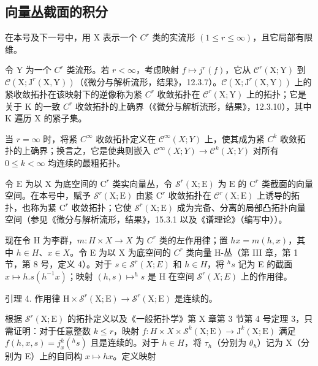 \subsection{向量丛截面的积分}

在本号及下一号中，用 X 表示一个 \(C^{r}\) 类的实流形 \((1 \leq r \leq \infty)\)，且它局部有限维。

令 Y 为一个 \(C^{r}\) 类流形。若 \(r < \infty\)，考虑映射 \(f \mapsto j^{r}(f)\)，它从 \(\mathcal{C}^{r}(\mathrm{X};\mathrm{Y})\) 到 \(\mathcal{C}(\mathrm{X};\mathrm{J}^{r}(\mathrm{X},\mathrm{Y}))\)（《微分与解析流形，结果》，12.3.7）。\(\mathcal{C}(\mathrm{X};\mathrm{J}^{r}(\mathrm{X},\mathrm{Y}))\) 上的紧收敛拓扑在该映射下的逆像称为紧 \(C^{r}\) 收敛拓扑在 \(\mathcal{C}^{r}(\mathrm{X};\mathrm{Y})\) 上的拓扑；它是关于 K 的一致 \(C^{r}\) 收敛拓扑的上确界（《微分与解析流形，结果》，12.3.10），其中 K 遍历 X 的紧子集。

当 \(r = \infty\) 时，将紧 \(C^{\infty}\) 收敛拓扑定义在 \(\mathcal{C}^{\infty}(X;Y)\) 上，使其成为紧 \(C^{k}\) 收敛拓扑的上确界；换言之，它是使典则嵌入 \(\mathcal{C}^{\infty}(X;Y) \to \mathcal{C}^{k}(X;Y)\) 对所有 \(0 \leq k < \infty\) 均连续的最粗拓扑。

令 \(\mathrm{E}\) 为以 \(\mathrm{X}\) 为底空间的 \(\mathrm{C}^r\) 类实向量丛，令 \(\mathcal{S}^r(\mathrm{X};\mathrm{E})\) 为 \(\mathrm{E}\) 的 \(\mathrm{C}^r\) 类截面的向量空间。在本号中，赋予 \(\mathcal{S}^r(\mathrm{X};\mathrm{E})\) 由紧 \(\mathrm{C}^r\) 收敛拓扑在 \(\mathcal{C}^r(\mathrm{X};\mathrm{E})\) 上诱导的拓扑，也称为紧 \(\mathrm{C}^r\) 收敛拓扑；它使 \(\mathcal{S}^r (\mathrm{X};\mathrm{E})\) 成为完备、分离的局部凸拓扑向量空间（参见《微分与解析流形，结果》，15.3.1 以及《谱理论》（编写中））。

现在令 H 为李群，\(m: H \times X \to X\) 为 \(C^{r}\) 类的左作用律；置 \(hx = m(h, x)\)，其中 \(h \in H\)、\(x \in X\)。令 E 为以 X 为底空间的 \(C^{r}\) 类向量 H-丛（第 III 章，第 1 节，第 8 号，定义 4）。对于 \(s \in \mathcal{S}^{r}(X; E)\) 和 \(h \in H\)，将 \(^{h}s\) 记为 E 的截面 \(x \mapsto h.s(h^{-1}x)\)；映射 \((h, s) \mapsto ^{h}s\) 是 H 在空间 \(\mathcal{S}^{r}(X; E)\) 上的作用律。

引理 4. 作用律 \(\mathrm{H} \times \mathcal{S}^r (\mathrm{X};\mathrm{E}) \to \mathcal{S}^r (\mathrm{X};\mathrm{E})\) 是连续的。

根据 \(\mathcal{S}^{r}(\mathrm{X};\mathrm{E})\) 的拓扑定义以及《一般拓扑学》第 X 章第 3 节第 4 号定理 3，只需证明：对于任意整数 \(k \leq r\)，映射 \(f : H \times X \times \mathcal{S}^{k}(\mathrm{X};\mathrm{E}) \to \mathrm{J}^{k}(\mathrm{X};\mathrm{E})\) 满足 \(f(h,x,s) = j_{x}^{k}(^{h}s)\) 且是连续的。对于 \(h \in H\)，将 \(\tau_{h}\)（分别为 \(\theta_{h}\)）记为 X（分别为 E）上的自同构 \(x \mapsto hx\)。定义映射

